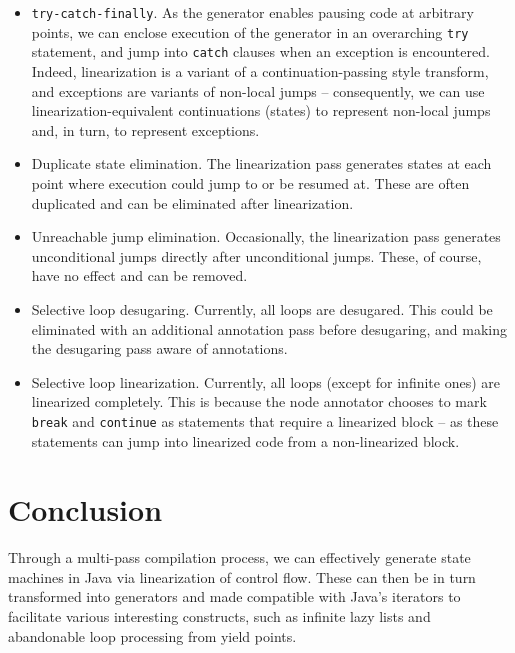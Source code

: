 \documentclass[journal,a4paper]{IEEEtran}
\begin{document}
\begin{itemize}
\item \texttt{try-catch-finally}. As the generator enables pausing code at arbitrary points, we can
      enclose execution of the generator in an overarching \texttt{try} statement, and jump into
      \texttt{catch} clauses when an exception is encountered. Indeed, linearization is a variant
      of a continuation-passing style transform, and exceptions are variants of non-local jumps --
      consequently, we can use linearization-equivalent continuations (states) to represent
      non-local jumps and, in turn, to represent exceptions.

\item Duplicate state elimination. The linearization pass generates states at each point where
      execution could jump to or be resumed at. These are often duplicated and can be eliminated
      after linearization.

\item Unreachable jump elimination. Occasionally, the linearization pass generates unconditional
      jumps directly after unconditional jumps. These, of course, have no effect and can be
      removed.

\item Selective loop desugaring. Currently, all loops are desugared. This could be eliminated with
      an additional annotation pass before desugaring, and making the desugaring pass aware of
      annotations.

\item Selective loop linearization. Currently, all loops (except for infinite ones) are linearized
      completely. This is because the node annotator chooses to mark \texttt{break} and
      \texttt{continue} as statements that require a linearized block -- as these statements can
      jump into linearized code from a non-linearized block.
\end{itemize}

\section{Conclusion}

Through a multi-pass compilation process, we can effectively generate state machines in Java via
linearization of control flow. These can then be in turn transformed into generators and made
compatible with Java's iterators to facilitate various interesting constructs, such as infinite
lazy lists and abandonable loop processing from yield points.
\end{document}
